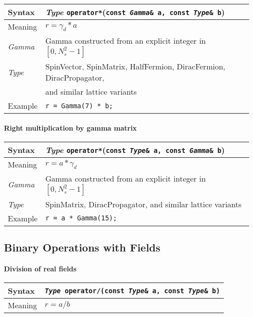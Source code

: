 \documentclass[12pt,letterpaper]{article}
\newcommand{\tHalfFermion}{HalfFermion}
\newcommand{\tDiracFermion}{DiracFermion}
\newcommand{\tDiracPropagator}{DiracPropagator}
\newcommand{\tSpinMatrix}{SpinMatrix}
\newcommand{\tSpinVector}{SpinVector}
\newcommand{\itt}{\it Type}
\newcommand{\protoBBinaryQual}[1]{{\tt {\it Type} #1(const {\it Type}\& a, const {\it Type}\& b)}}
\begin{document}
\begin{flushleft}
  \begin{tabular}{|l|l|}
  \hline
  Syntax      & {\it Type} \verb|operator*|({\tt const {\it Gamma}\& a, const {\it Type}\& b})\\
  \hline
  Meaning     & $r = \gamma_d * a$ \\
  \hline
  {\it Gamma} & Gamma constructed from an explicit integer in $[0,N_s^2-1]$\\
  \itt        & \tSpinVector, \tSpinMatrix, \tHalfFermion, \tDiracFermion, \tDiracPropagator, \\
              & and similar lattice variants \\
  \hline
  Example     & \verb|r = Gamma(7) * b;|\\
  \hline
  \end{tabular}
\end{flushleft}

\paragraph{Right multiplication by gamma matrix}
\begin{flushleft}
  \begin{tabular}{|l|l|}
  \hline
  Syntax      & {\it Type} \verb|operator*|({\tt const {\it Type}\& a, const {\it Gamma}\& b})\\
  \hline
  Meaning     & $r = a * \gamma_d$ \\
  \hline
  {\it Gamma} & Gamma constructed from an explicit integer in $[0,N_s^2-1]$\\
  \itt        & \tSpinMatrix, \tDiracPropagator, and similar lattice variants \\
  \hline
  Example     & \verb|r = a * Gamma(15);|\\
  \hline
  \end{tabular}
\end{flushleft}

\subsection{Binary Operations with Fields}

\paragraph{Division of real fields}

\begin{flushleft}
  \begin{tabular}{|l|l|}
  \hline
  Syntax      & \protoBBinaryQual{operator/} \\
  \hline
  Meaning     & $r = a/b$ \\
  \hline
  \end{tabular}
\end{flushleft}
\end{document}

